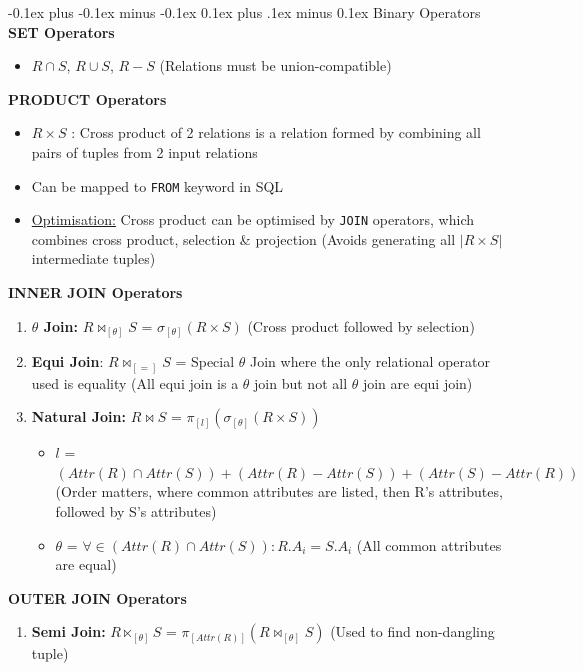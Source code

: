 \documentclass[landscape]{article}
\makeatletter
\renewcommand{\subsection}{\@startsection{subsection}{2}{0mm}%
  {-0.1ex plus -0.1ex minus -0.1ex}%
  {0.1ex plus .1ex minus 0.1ex}%
{\normalfont\scriptsize\bfseries}}
\makeatother
\begin{document}
\begin{multicols*}{5}
    \subsection{Binary Operators}
    \textbf{SET Operators}
    \begin{itemize}
      \item $R \cap S$, $R \cup S$, $R - S$ (Relations must be union-compatible)
    \end{itemize}
    \textbf{PRODUCT Operators}
    \begin{itemize}
      \item $R \times S$ : Cross product of 2 relations is a relation formed by combining all pairs of tuples from 2 input relations
      \item Can be mapped to \verb|FROM| keyword in SQL
      \item \underline{Optimisation:} Cross product can be optimised by \verb|JOIN| operators, which combines cross product, selection \& projection (Avoids generating all $\vert R \times S \vert$ intermediate tuples)
    \end{itemize}
    \textbf{INNER JOIN Operators}
    \begin{enumerate}
      \item \textbf{$\theta$ Join:} $R \Join_{[\theta]}S$ = $\sigma_{[\theta]}(R \times S)$ (Cross product followed by selection)
      \item \textbf{Equi Join}: $R \Join_{[=]}S$ = Special $\theta$ Join where the only relational operator used is equality (All equi join is a $\theta$ join but not all $\theta$ join are equi join)
      \item \textbf{Natural Join:} $R \Join S$ = $\pi_{[l]} (\sigma_{[\theta]}(R \times S))$
      \begin{itemize}
        \item $l$ = $(Attr(R) \cap Attr(S)) + (Attr(R) - Attr(S)) + (Attr(S) - Attr(R))$ (Order matters, where common attributes are listed, then R's attributes, followed by S's attributes)
        \item $\theta$ = $\forall \in (Attr(R) \cap Attr(S)): R.A_i = S.A_i$ (All common attributes are equal)
      \end{itemize}
    \end{enumerate}
    \textbf{OUTER JOIN Operators}
    \begin{enumerate}
      \item \textbf{Semi Join:} $R \ltimes_{[\theta]}S$ = $\pi_{[Attr(R)]}(R \Join_{[\theta]}S)$ (Used to find non-dangling tuple)

\end{enumerate}
\end{multicols*}
\end{document}
